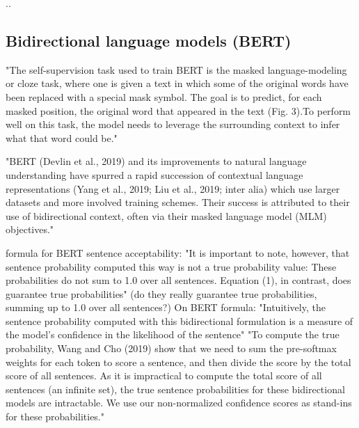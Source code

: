 %

..

\subsection{Bidirectional language models (BERT)}

"The self-supervision task used to train BERT is the masked language-modeling  or  cloze  task,  where  one  is  given  a  text  in which  some  of  the  original  words  have  been  replaced  with  a special  mask  symbol.  The  goal  is  to  predict,  for  each  masked position,  the  original  word  that  appeared  in  the  text  (Fig.  3).To perform well on this task, the model needs to leverage the surrounding context to infer what that word could be." \citep{manning2020emergent}

"BERT (Devlin et al., 2019) and its improvements to natural language understanding have spurred a rapid succession of contextual language representations (Yang et al., 2019; Liu et al., 2019; inter alia) which use larger datasets and more involved training schemes. Their success is attributed to their use of bidirectional context, often via their masked language model (MLM) objectives." \citet{salazar2020masked}



\citet{lau2020furiously} formula for BERT sentence acceptability:
"It is important to note, however, that
sentence probability computed this way is not
a true probability value: These probabilities do
not sum to 1.0 over all sentences. Equation (1),
in contrast, does guarantee true probabilities" \citep{lau2020furiously}
(do they really guarantee true probabilities, summing up to 1.0 over all sentences?)
On BERT formula:
"Intuitively, the sentence probability computed
with this bidirectional formulation is a measure of the model’s confidence in the likelihood of the
sentence"\citep{lau2020furiously}
"To compute the true probability, Wang and
Cho (2019) show that we need to sum the
pre-softmax weights for each token to score a
sentence, and then divide the score by the total
score of all sentences. As it is impractical to
compute the total score of all sentences (an
infinite set), the true sentence probabilities for
these bidirectional models are intractable. We use
our non-normalized confidence scores as stand-ins
for these probabilities."\citep{lau2020furiously}
 
